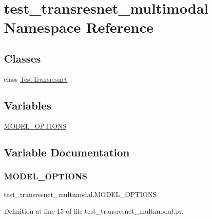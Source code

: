 \hypertarget{namespacetest__transresnet__multimodal}{}\section{test\+\_\+transresnet\+\_\+multimodal Namespace Reference}
\label{namespacetest__transresnet__multimodal}
\subsection*{Classes}
\begin{DoxyCompactItemize}
\item 
class \hyperlink{classtest__transresnet__multimodal_1_1TestTransresnet}{Test\+Transresnet}
\end{DoxyCompactItemize}
\subsection*{Variables}
\begin{DoxyCompactItemize}
\item 
\hyperlink{namespacetest__transresnet__multimodal_a908948ea93099699527056ec25ccc779}{M\+O\+D\+E\+L\+\_\+\+O\+P\+T\+I\+O\+NS}
\end{DoxyCompactItemize}


\subsection{Variable Documentation}
\mbox{\label{namespacetest__transresnet__multimodal_a908948ea93099699527056ec25ccc779}} 
\subsubsection{\texorpdfstring{M\+O\+D\+E\+L\+\_\+\+O\+P\+T\+I\+O\+NS}{MODEL\_OPTIONS}}
{\footnotesize\ttfamily test\+\_\+transresnet\+\_\+multimodal.\+M\+O\+D\+E\+L\+\_\+\+O\+P\+T\+I\+O\+NS}



Definition at line 15 of file test\+\_\+transresnet\+\_\+multimodal.\+py.

